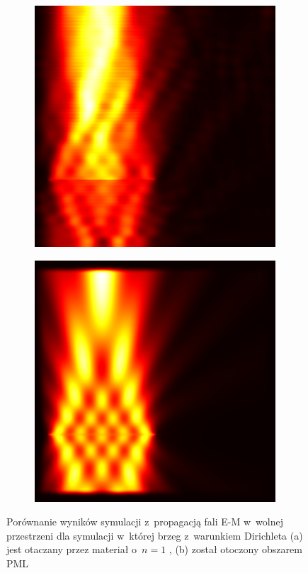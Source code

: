 \begin{figure}[tb]
	\centering
	\begin{subfigure}{0.45\textwidth}
		\includegraphics[width=\textwidth]{images/wstep/SUM-nopml-energy.png}
		\caption{}
		\label{fig:wstep-pml-bad}
	\end{subfigure}
	\begin{subfigure}{0.45\textwidth}
		\includegraphics[width=\textwidth]{images/wstep/SUM-pml-energy.png}
		\caption{}
	\end{subfigure}
	\caption{Porównanie wyników symulacji z~propagacją fali E-M w~wolnej przestrzeni dla symulacji w~której brzeg z~warunkiem Dirichleta (a) jest otaczany przez materiał o~$n=1$ , (b) został otoczony obszarem PML}
\end{figure}

